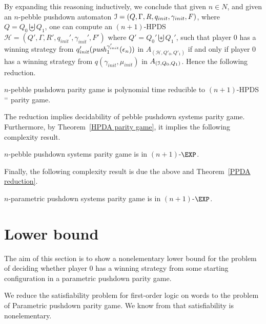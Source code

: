 \documentclass[a4paper,UKenglish,cleveref, autoref, thm-restate]{lipics-v2021}
\renewcommand{\H}{\mathcal{H}}
\begin{document}
By expanding this reasoning inductively, we conclude that given $n \in N$, and
given an $n$-pebble pushdown automaton 
$\mathcal{I} = (Q, \Gamma, R, q_{init}, \gamma_{init}, F)$, where $Q= Q_0 \biguplus Q_1$,
one can compute an $(n+1)$-HPDS 
$\H = (Q', \Gamma, R', q_{init}', \gamma_{init}', F')$  where $Q'= Q_0' \biguplus Q_1'$, 
such 
that 
player $0$ has a winning strategy from $q'_{init}(\text{\textit{push}}_1^{\gamma_{init}'}(\epsilon_{n}))$ in $A_{(\H,Q'_0,Q'_1)}$ 
if
and only if
player $0$ has a winning strategy from $q(\gamma_{init},\mu_{init})$ in $A_{(\mathcal{I},Q_0,Q_1)}$. 
Hence the following reduction.

\begin{theorem} 
{\sc $n$-pebble pushdown parity game} is polynomial time reducible
to {\sc $(n+1)$-HPDS$^=$ parity game}.
\end{theorem}

The reduction implies decidability of pebble pushdown systems parity game. Furthermore,
by Theorem~\ref{HPDA parity game}, it implies the following complexity result.


\begin{theorem}
{\sc $n$-pebble pushdown systems parity game} is in $(n+1)$-$\EXP$.
\end{theorem}

Finally, the following complexity result is due the above and Theorem~\ref{PPDA reduction}.

\begin{corollary}
{\sc $n$-parametric pushdown systems parity game} is in $(n+1)$-$\EXP$.
\end{corollary}











\section{Lower bound}

The aim of this section is to show a nonelementary lower bound for the 
problem of deciding whether player $0$ has a winning strategy from some starting configuration in
a parametric pushdown parity game.


We reduce the satisfiability problem for first-order logic on words
to the problem of {\sc Parametric pushdown parity game}. 
We know from \cite{Sto74}
that satisfiability is nonelementary. 
%
\end{document}
